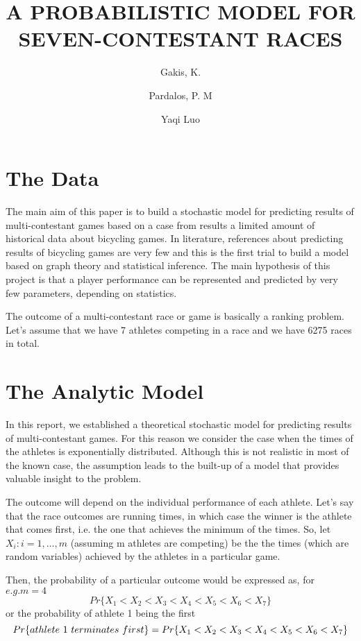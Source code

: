 \documentclass[
journal=jacsat, %
manuscript=article]{achemso}
\author{Gakis, K.}
\author{Pardalos, P. M}
\author{Yaqi Luo}
\affiliation[University of Florida]
{Dept. of Industrial & Systems Engineering, University of Florida}
\affiliation[Address]
{401 Weil Hall, Gainesville FL-32601, USA}
\title[\texttt{achemso} demonstration]
{A PROBABILISTIC MODEL FOR SEVEN-CONTESTANT RACES}
\begin{document}
\section{The Data}

The main aim of this paper is to build a stochastic model for predicting results of multi-contestant games based on a case from results a limited amount of historical data about bicycling games. In literature, references about predicting results of bicycling games are very few and this is the first trial to build a model based on graph theory and statistical inference. The main hypothesis of this project is that a player performance can be represented and predicted by very few parameters, depending on statistics. 

The outcome of a multi-contestant race or game is basically a ranking problem. Let’s assume that we have 7 athletes competing in a race and we have 6275 races in total.


\section{The Analytic Model}

In this report, we established a theoretical stochastic model for predicting results of multi-contestant games. For this reason we consider the case when the times of the athletes is exponentially distributed. Although this is not realistic in most of the known case, the assumption leads to the built-up of a model that provides valuable insight to the problem. 

The outcome will depend on the individual performance of each athlete. Let’s say that the race outcomes are running times, in which case the winner is the athlete that comes first, i.e. the one that achieves the minimum of the times. So, let $X_i:i = 1,\ldots,m$ (assuming m athletes are competing) be the the times (which are random variables) achieved by the athletes in a particular game. 

Then, the probability of a particular outcome would be expressed as, for $e.g. m = 4$
$$Pr\{X_1 < X_2 < X_3 < X_4 < X_5 < X_6 < X_7\}$$
or the probability of athlete 1 being the first
$$Pr\mbox\{athlete\ 1\ terminates\ first\} = Pr\{X_1 < X_2 < X_3 < X_4 < X_5 < X_6 < X_7\}$$
\end{document}
